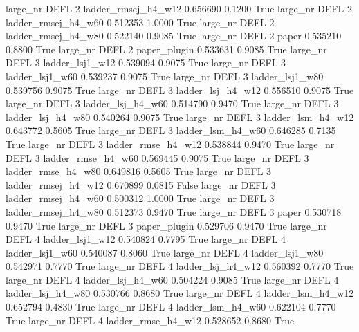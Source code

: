   large_nr     DEFL                 2 ladder_rmsej_h4_w12   0.656690      0.1200    True
  large_nr     DEFL                 2 ladder_rmsej_h4_w60   0.512353      1.0000    True
  large_nr     DEFL                 2 ladder_rmsej_h4_w80   0.522140      0.9085    True
  large_nr     DEFL                 2               paper   0.535210      0.8800    True
  large_nr     DEFL                 2        paper_plugin   0.533631      0.9085    True
  large_nr     DEFL                 3     ladder_lsj1_w12   0.539094      0.9075    True
  large_nr     DEFL                 3     ladder_lsj1_w60   0.539237      0.9075    True
  large_nr     DEFL                 3     ladder_lsj1_w80   0.539756      0.9075    True
  large_nr     DEFL                 3   ladder_lsj_h4_w12   0.556510      0.9075    True
  large_nr     DEFL                 3   ladder_lsj_h4_w60   0.514790      0.9470    True
  large_nr     DEFL                 3   ladder_lsj_h4_w80   0.540264      0.9075    True
  large_nr     DEFL                 3   ladder_lsm_h4_w12   0.643772      0.5605    True
  large_nr     DEFL                 3   ladder_lsm_h4_w60   0.646285      0.7135    True
  large_nr     DEFL                 3  ladder_rmse_h4_w12   0.538844      0.9470    True
  large_nr     DEFL                 3  ladder_rmse_h4_w60   0.569445      0.9075    True
  large_nr     DEFL                 3  ladder_rmse_h4_w80   0.649816      0.5605    True
  large_nr     DEFL                 3 ladder_rmsej_h4_w12   0.670899      0.0815   False
  large_nr     DEFL                 3 ladder_rmsej_h4_w60   0.500312      1.0000    True
  large_nr     DEFL                 3 ladder_rmsej_h4_w80   0.512373      0.9470    True
  large_nr     DEFL                 3               paper   0.530718      0.9470    True
  large_nr     DEFL                 3        paper_plugin   0.529706      0.9470    True
  large_nr     DEFL                 4     ladder_lsj1_w12   0.540824      0.7795    True
  large_nr     DEFL                 4     ladder_lsj1_w60   0.540087      0.8060    True
  large_nr     DEFL                 4     ladder_lsj1_w80   0.542971      0.7770    True
  large_nr     DEFL                 4   ladder_lsj_h4_w12   0.560392      0.7770    True
  large_nr     DEFL                 4   ladder_lsj_h4_w60   0.504224      0.9085    True
  large_nr     DEFL                 4   ladder_lsj_h4_w80   0.530766      0.8680    True
  large_nr     DEFL                 4   ladder_lsm_h4_w12   0.652794      0.4830    True
  large_nr     DEFL                 4   ladder_lsm_h4_w60   0.622104      0.7770    True
  large_nr     DEFL                 4  ladder_rmse_h4_w12   0.528652      0.8680    True
